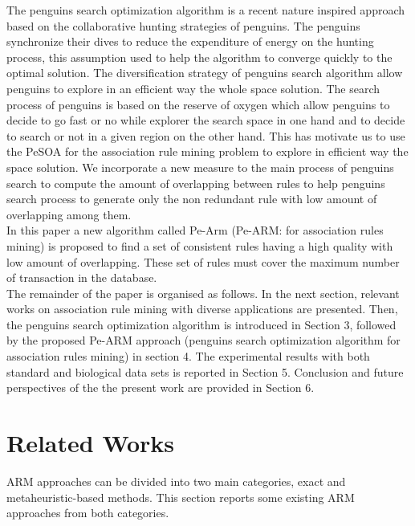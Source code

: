 \documentclass[preprint,12pt]{elsarticle}
\begin{document}
The penguins search optimization algorithm \cite{15} is a recent nature inspired approach based on the collaborative hunting strategies of penguins. The penguins synchronize their dives to reduce the expenditure of energy on the hunting process, this assumption used to help the algorithm to converge quickly to the optimal solution. The diversification strategy of penguins search algorithm allow penguins to explore in an efficient way the whole space solution. The search process of penguins is based on the reserve of oxygen which allow penguins to decide to go fast or no while explorer the search space in one hand and to decide to search or not in a given region on the other hand. This has motivate us to use the PeSOA for the association rule mining problem to explore in efficient way the space solution. We incorporate a new measure to the main process of penguins search to compute the amount of overlapping between rules to help penguins search process to generate only the non redundant rule with low amount of overlapping among them. \\
In this paper a new algorithm called Pe-Arm (Pe-ARM: for association rules mining) is proposed  to find a set of consistent rules having a high quality with low amount of overlapping. These set of rules must cover the maximum number of transaction in the database.\\
The remainder of the paper is organised as follows. In the next section, relevant works on association rule mining with diverse applications are presented. 
Then, the penguins search optimization algorithm is introduced in Section 3, 
followed by the proposed Pe-ARM approach  (penguins search optimization algorithm for association rules mining) in section 4. 
The experimental results with both standard and biological data sets is reported in Section 5. 
Conclusion and future perspectives of the the present work are provided in Section 6.
\section{Related Works}
ARM approaches can be divided into two main categories, exact and metaheuristic-based methods.
This section reports some existing ARM approaches from both categories.
\end{document}
